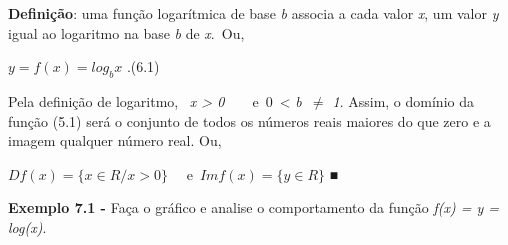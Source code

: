 \documentclass[12pt]{article}
\begin{document}
\par 
 \begin{tikzpicture}



\end{tikzpicture}
\begin{adjustwidth}{0.79in}{0.0in}
\begin{justify}
\textbf{Definição}: uma função logarítmica de base \textit{b} associa a cada valor \textit{x}, um valor \textit{y} igual ao logaritmo na base \textit{b} de \textit{x}.\  Ou,
\end{justify}\par

\end{adjustwidth}


\vspace{\baselineskip}
\begin{adjustwidth}{1.28in}{0.0in}
 \( y=f \left( x \right) =log_{b}x  \) .\tab \tab \tab \tab \tab \tab (6.1)\par

\end{adjustwidth}


\vspace{\baselineskip}
\begin{adjustwidth}{0.75in}{0.0in}
Pela definição de logaritmo, \   \textit{x > 0}\ \ \ \ e\   0\  < \textit{b\  $ \neq $  1}. Assim, o domínio da função (5.1) será o conjunto de todos os números reais maiores do que zero e a imagem qualquer número real. Ou,\par

\end{adjustwidth}


\vspace{\baselineskip}
\begin{adjustwidth}{0.75in}{0.0in}
 \( Df \left( x \right) = \{ x \in R / x>0 \}  \) \ \  \tab e\  \tab  \( Imf \left( x \right) = \{ y \in R  \}  \) ■\par

\end{adjustwidth}


\vspace{\baselineskip}

\vspace{\baselineskip}
\begin{adjustwidth}{0.75in}{0.0in}
\textbf{Exemplo 7.1 - }Faça o gráfico e analise o comportamento da função \textit{f(x) = y = log(x)}.\par

\end{adjustwidth}
\end{document}
